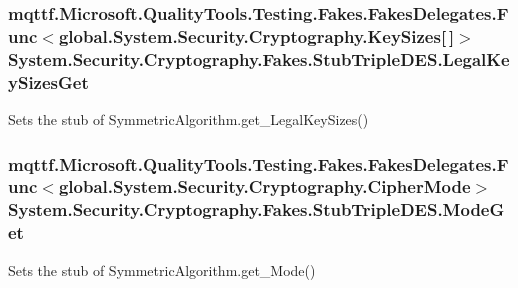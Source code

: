 \hypertarget{class_system_1_1_security_1_1_cryptography_1_1_fakes_1_1_stub_triple_d_e_s_a30a42ea0d7b6fcb281bc4792415390ac}{
\subsubsection[{Legal\-Key\-Sizes\-Get}]{\setlength{\rightskip}{0pt plus 5cm}mqttf.\-Microsoft.\-Quality\-Tools.\-Testing.\-Fakes.\-Fakes\-Delegates.\-Func$<$global.\-System.\-Security.\-Cryptography.\-Key\-Sizes\mbox{[}$\,$\mbox{]}$>$ System.\-Security.\-Cryptography.\-Fakes.\-Stub\-Triple\-D\-E\-S.\-Legal\-Key\-Sizes\-Get}}\label{class_system_1_1_security_1_1_cryptography_1_1_fakes_1_1_stub_triple_d_e_s_a30a42ea0d7b6fcb281bc4792415390ac}


Sets the stub of Symmetric\-Algorithm.\-get\-\_\-\-Legal\-Key\-Sizes()

\hypertarget{class_system_1_1_security_1_1_cryptography_1_1_fakes_1_1_stub_triple_d_e_s_acbb7ec0ff30ecef10a697e701b3c4277}{
\subsubsection[{Mode\-Get}]{\setlength{\rightskip}{0pt plus 5cm}mqttf.\-Microsoft.\-Quality\-Tools.\-Testing.\-Fakes.\-Fakes\-Delegates.\-Func$<$global.\-System.\-Security.\-Cryptography.\-Cipher\-Mode$>$ System.\-Security.\-Cryptography.\-Fakes.\-Stub\-Triple\-D\-E\-S.\-Mode\-Get}}\label{class_system_1_1_security_1_1_cryptography_1_1_fakes_1_1_stub_triple_d_e_s_acbb7ec0ff30ecef10a697e701b3c4277}


Sets the stub of Symmetric\-Algorithm.\-get\-\_\-\-Mode()

